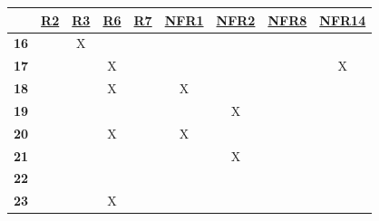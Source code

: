 \documentclass[12pt, titlepage]{article}
\begin{document}
\noindent
\begin{table} [H]
  \centering
  \begin{tabular}{|c|c|c|c|c|c|c|c|c|}
    \hline
                 & \href{https://github.com/zakerl/Capstone_Project/blob/main/docs/SRS/SRS.pdf}{R2} & \href{https://github.com/zakerl/Capstone_Project/blob/main/docs/SRS/SRS.pdf}{R3} & \href{https://github.com/zakerl/Capstone_Project/blob/main/docs/SRS/SRS.pdf}{R6} & \href{https://github.com/zakerl/Capstone_Project/blob/main/docs/SRS/SRS.pdf}{R7} & \href{https://github.com/zakerl/Capstone_Project/blob/main/docs/SRS/SRS.pdf}{NFR1} & \href{https://github.com/zakerl/Capstone_Project/blob/main/docs/SRS/SRS.pdf}{NFR2} & \href{https://github.com/zakerl/Capstone_Project/blob/main/docs/SRS/SRS.pdf}{NFR8} & \href{https://github.com/zakerl/Capstone_Project/blob/main/docs/SRS/SRS.pdf}{NFR14} \\
    \hline
\textbf{16} &                     & X                    &                     &                     &                   &                  &                       & \\ \hline
\textbf{17} &                     &                     &        X             &                     &                   &                  &                       & X\\ \hline
\textbf{18} &                     &                     &       X              &                     &        X           &                  &                       & \\ \hline
\textbf{19} &                     &                     &                     &                     &                   &     X             &                       & \\ \hline
\textbf{20} &                     &                     &            X         &                     &     X              &                  &                       & \\ \hline
\textbf{21} &                     &                     &                     &                     &                   &        X          &                       & \\ \hline
\textbf{22} &                     &                     &                     &                     &                   &                  &                       & \\ \hline
\textbf{23} &                     &                     &   X                  &                     &                   &                  &                       & \\ \hline

\end{tabular}
\end{table}
\end{document}
